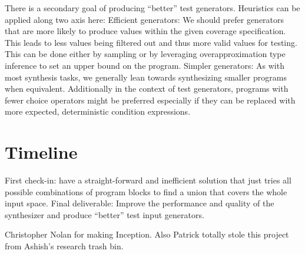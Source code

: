 \documentclass[review, sigplan]{acmart}
\begin{document}
There is a secondary goal of producing “better” test generators. Heuristics can be applied along two axis here:
Efficient generators: We should prefer generators that are more likely to produce values within the given coverage specification. This leads to less values being filtered out and thus more valid values for testing. This can be done either by sampling or by leveraging overapproximation type inference to set an upper bound on the program.
Simpler generators: As with most synthesis tasks, we generally lean towards synthesizing smaller programs when equivalent. Additionally in the context of test generators, programs with fewer choice operators might be preferred especially if they can be replaced with more expected, deterministic condition expressions.
\section{Timeline}
First check-in: have a straight-forward and inefficient solution that just tries all possible combinations of program blocks to find a union that covers the whole input space.
Final deliverable: Improve the performance and quality of the synthesizer and produce “better” test input generators.

\begin{acks}
    Christopher Nolan for making Inception. Also Patrick totally stole this project from Ashish's research trash bin.
\end{acks}



\end{document}

